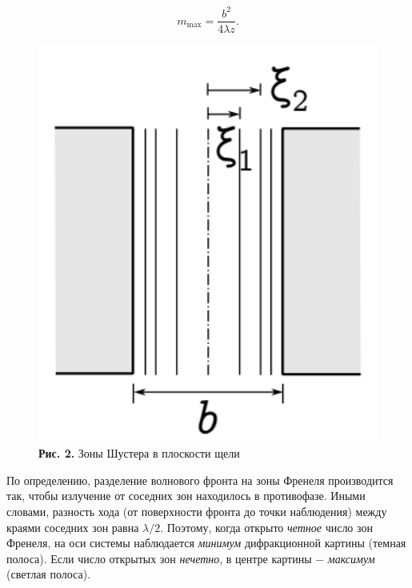 \documentclass[a4paper,12pt]{article} %
\begin{document}
$$
m_{\text{max}} = \frac{b^2}{4\lambda z}.
$$

\begin{figure}
\begin{center}
    \includegraphics[width=1\textwidth]{4.3.1_2.png}
    \textbf{Рис. 2.} Зоны Шустера в плоскости щели
\end{center}
\end{figure}

\hfill \break По определению, разделение волнового фронта на зоны Френеля производится так, чтобы излучение от соседних зон находилось в противофазе. Иными словами, разность хода (от поверхности фронта до точки наблюдения) между краями соседних зон равна $\lambda/2$. Поэтому, когда открыто \textit{четное} число зон Френеля, на оси системы наблюдается \textit{минимум} дифракционной картины (темная полоса). Если число открытых зон \textit{нечетно}, в центре картины $-$ \textit{максимум} (светлая полоса).
\end{document}

